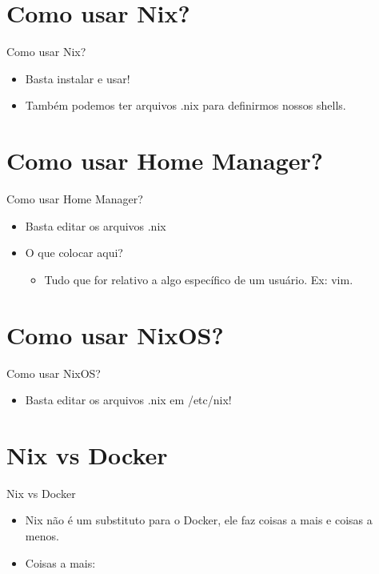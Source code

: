 \documentclass[presentation]{beamer}
\begin{document}
\section{Como usar Nix?}
\label{sec:orgad72c17}

\begin{frame}[label={sec:org7f2b772}]{Como usar Nix?}
\begin{itemize}
\item Basta instalar e usar!
\item Também podemos ter arquivos .nix para definirmos nossos shells.
\end{itemize}
\end{frame}

\section{Como usar Home Manager?}
\label{sec:org43082c2}

\begin{frame}[label={sec:org58ea020}]{Como usar Home Manager?}
\begin{itemize}
\item Basta editar os arquivos .nix
\item O que colocar aqui?
\begin{itemize}
\item Tudo que for relativo a algo específico de um usuário. Ex: vim.
\end{itemize}
\end{itemize}
\end{frame}

\section{Como usar NixOS?}
\label{sec:orgf57f315}

\begin{frame}[label={sec:org6e9f855}]{Como usar NixOS?}
\begin{itemize}
\item Basta editar os arquivos .nix em /etc/nix!
\end{itemize}
\end{frame}

\section{Nix vs Docker}
\label{sec:org85b3c1c}
\begin{frame}[label={sec:orged25ef7}]{Nix vs Docker}
\begin{itemize}
\item Nix não é um substituto para o Docker, ele faz coisas a mais e coisas a menos.
\item Coisas a mais:
\end{itemize}
\end{frame}
\end{document}
